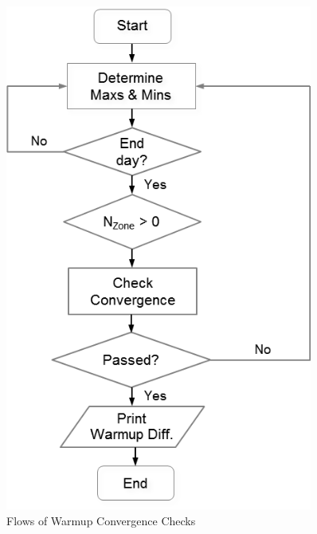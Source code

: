 \begin{figure}[hbtp] %
\centering
\includegraphics[width=0.9\textwidth, height=0.9\textheight, keepaspectratio=true]{media/image6.png}
\caption{Flows of Warmup Convergence Checks \protect \label{fig:flows-of-warmup-convergence-checks}}
\end{figure}

